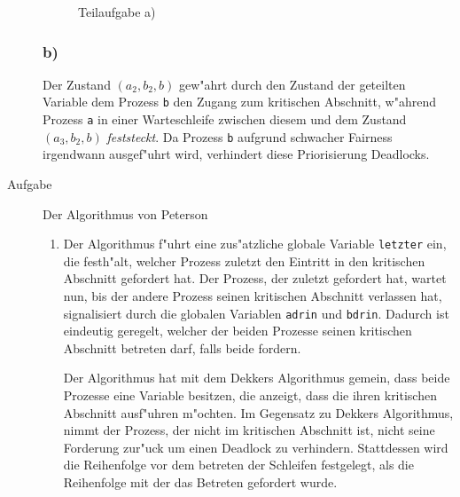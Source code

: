 \documentclass[a4paper,twoside,12pt,fleqn]{article}
\newcounter{AUFGNR}
\newcommand{\AUFGABE}[2]{\vspace{0.3cm}\item[Aufgabe~\arabic{AUFGNR}]\stepcounter{AUFGNR} #1\hfill\emph{#2}}
\begin{document}
\begin{description}
\begin{figure}[htbp]
		\caption{Teilaufgabe a)}
	\end{figure}
	\subsubsection*{b)}
	Der Zustand $(a_2, b_2, b)$ gew"ahrt durch den Zustand der geteilten Variable dem Prozess \texttt{b} den Zugang zum kritischen Abschnitt, w"ahrend Prozess \texttt{a} in einer Warteschleife zwischen diesem und dem Zustand $(a_3, b_2, b)$ \textit{feststeckt}. Da Prozess \texttt{b} aufgrund schwacher Fairness irgendwann ausgef"uhrt wird, verhindert diese Priorisierung Deadlocks.

	\AUFGABE{Der Algorithmus von Peterson}{}
	\begin{enumerate}
		\item Der Algorithmus f"uhrt eine zus"atzliche globale Variable \texttt{letzter} ein, die festh"alt, welcher Prozess zuletzt den Eintritt in den kritischen Abschnitt gefordert hat. Der Prozess, der zuletzt gefordert hat, wartet nun, bis der andere Prozess seinen kritischen Abschnitt verlassen hat, signalisiert durch die globalen Variablen \texttt{adrin} und \texttt{bdrin}. Dadurch ist eindeutig geregelt, welcher der beiden Prozesse seinen kritischen Abschnitt betreten darf, falls beide fordern.

		      Der Algorithmus hat mit dem Dekkers Algorithmus gemein, dass beide Prozesse eine Variable besitzen, die anzeigt, dass die ihren kritischen Abschnitt ausf"uhren m"ochten. Im Gegensatz zu Dekkers Algorithmus, nimmt der Prozess, der nicht im kritischen Abschnitt ist, nicht seine Forderung zur"uck um einen Deadlock zu verhindern. Stattdessen wird die Reihenfolge vor dem betreten der Schleifen festgelegt, als die Reihenfolge mit der das Betreten gefordert wurde.
	\end{enumerate}


\end{description}
\end{document}
